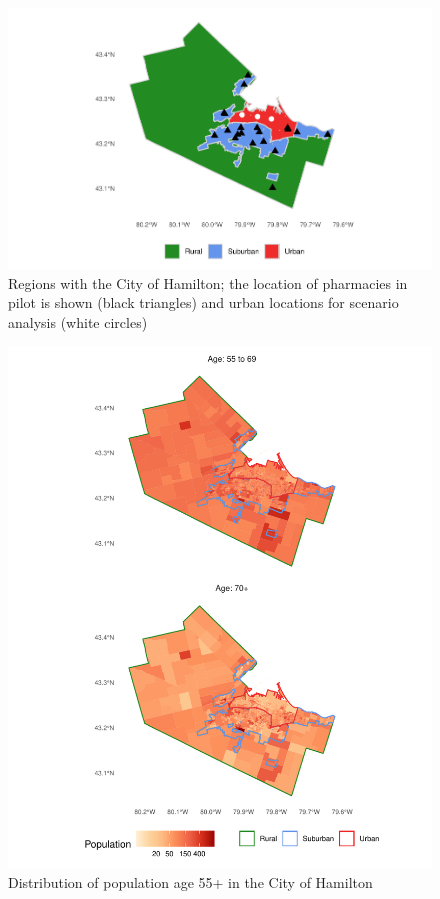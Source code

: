 \documentclass[]{elsarticle} %
\begin{document}
\begin{figure}

{\centering \includegraphics{Accessibility-Vaccination-Sites-Hamilton_files/figure-latex/pharmacies-map-1} 

}

\caption{\label{fig:pharmacies-and-regions}Regions with the City of Hamilton; the location of pharmacies in pilot is shown (black triangles) and urban locations for scenario analysis (white circles)}\label{fig:pharmacies-map}
\end{figure}

\begin{figure}

{\centering \includegraphics{Accessibility-Vaccination-Sites-Hamilton_files/figure-latex/population-map-1} 

}

\caption{\label{fig:population-map}Distribution of population age 55+ in the City of Hamilton}\label{fig:population-map}
\end{figure}
\end{document}
